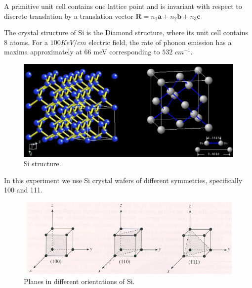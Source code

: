 \documentclass[openany,11pt,a4paper]{report}
\begin{document}
A primitive unit cell contains one lattice point and is invariant with respect to discrete translation by a translation vector $\mathbf{R}=n_{1} \mathbf{a}+n_{2} \mathbf{b}+n_{3} \mathbf{c}$
 











The crystal structure of Si is the Diamond structure, where its unit cell contains 8 atoms. For a $100 KeV/cm$ electric field, the rate of phonon emission has a maxima approximately at $66$ meV corresponding to $532$ $cm^{-1}$. \cite{energies}





\begin{figure}[H]
\centering
\includegraphics[scale=0.6]{diamondSi.PNG}
\caption{Si structure. \cite{Sipdf}}
\end{figure}



In this experiment we use Si crystal wafers of different symmetries, specifically  100 and 111. 




\begin{figure}[hbtp]
\centering
\includegraphics[scale=1.2]{Siorient.PNG}
\caption{Planes in different orientations of Si.}
\end{figure}
\end{document}
